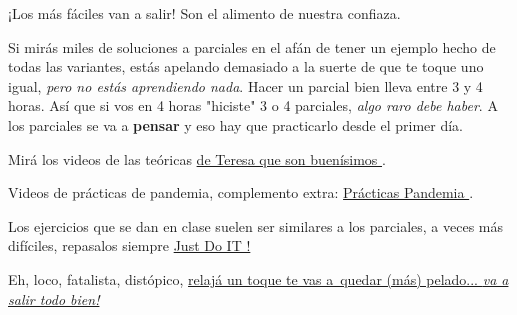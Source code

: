 {\begin{minipage}{0.7\textwidth}
    ¡Los más fáciles van a salir! Son el alimento de nuestra confiaza.\par\medskip

    Si mirás miles de soluciones a parciales en el afán de tener un ejemplo hecho de todas las
    variantes, estás apelando demasiado a la suerte de que te toque uno igual, \textit{pero no estás aprendiendo nada}.
    Hacer un parcial bien lleva entre 3 y 4 horas. Así que si vos en 4 horas "hiciste" 3 o 4 parciales, \textit{algo raro debe haber}.
    A los parciales se va a \textbf{pensar} y eso hay que practicarlo desde el primer día.\par\bigskip

          Mirá los videos de las teóricas \href{\videosTeresa}{de Teresa que son buenísimos }.\par\medskip
          Videos de prácticas de pandemia, complemento extra: \href{\videosPracticas}{Prácticas Pandemia }.\par\bigskip

    Los ejercicios que se dan en clase suelen ser similares a los parciales,
    a veces más difíciles, repasalos siempre \href{\justDoIt}{Just Do IT !}
  \end{minipage}
}
\vspace*{\fill}

Eh, loco, fatalista, distópico, \href{\dontWorryAboutAThing}{relajá un toque te vas a\
  quedar (más) pelado...  \textit{va a salir todo bien!}}
